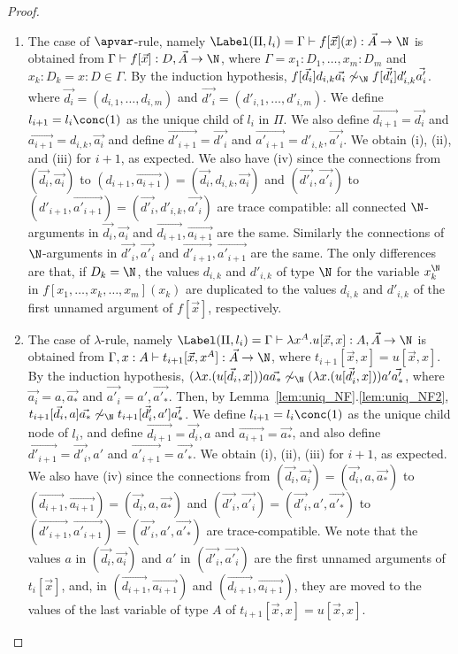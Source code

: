 \begin{proof}
\begin{enumerate}
  \item
    The case of $\apvar$-rule, namely 
    $\Label(\Pi,l_i) 
    = 
    \Gamma \vdash f[\vec{x}](x): \vec{A}\rightarrow\N$ is obtained from
    $\Gamma \vdash f[\vec{x}]: D,\vec{A} \rightarrow \N$,
    where $\Gamma=x_1:D_1,\ldots,x_m:D_m$ and $x_k:D_k = x:D\in\Gamma$. 
    By the induction hypothesis, $f[\vec{d_i}]d_{i,k}\vec{a_i} \not\sim_\N f[\vec{d'_i}]d'_{i,k}\vec{a'_i}$. 
    where $\vec{d_i} = (d_{i,1},\ldots,d_{i,m})$ and $\vec{d'_i} = (d'_{i,1},\ldots,d'_{i,m})$. 
    We define $l_{i+1}=l_i\conc(1)$ as the unique child of $l_i$ in $\Pi$. 
    We also define $\vec{d_{i+1}} = \vec{d_i}$ and $\vec{a_{i+1}} = d_{i,k},\vec{a_i}$
    and define $\vec{d'_{i+1}} = \vec{d'_i}$ and $\vec{a'_{i+1}} = d'_{i,k},\vec{a'_i}$. 
    We obtain (i), (ii), and (iii) for $i+1$, as expected.
    We also have (iv) since the connections from
    $(\vec{d_i},\vec{a_i})$ to $(d_{i+1},\vec{a_{i+1}}) = (\vec{d_i},d_{i,k},\vec{a_i})$
    and
    $(\vec{d'_i},\vec{a'_i})$ to $(d'_{i+1},\vec{a'_{i+1}}) = (\vec{d'_i},d'_{i,k},\vec{a'_i})$
    are trace compatible: all connected $\N$-arguments in $\vec{d_{i}},\vec{a_{i}}$ and 
    $\vec{d_{i+1}},\vec{a_{i+1}}$ are the same. Similarly
    the connections of $\N$-arguments in $\vec{d'_i},\vec{a'_i}$ and $\vec{d'_{i+1}},\vec{a'_{i+1}}$ are the same.
    The only differences are that, if $D_k = \N$, the values $d_{i,k}$ and $d'_{i,k}$ of type $\N$
    for the variable $x_k^\N$ in $f[x_1,\ldots,x_k,\ldots,x_m](x_k)$ are duplicated to the values
    $d_{i,k}$ and $d'_{i,k}$ of the first unnamed argument of $ f[\vec{x}]$, respectively. 

  \item
    The case of $\lambda$-rule, namely
    $\Label(\Pi,l_i) = 
    \Gamma\vdash \lambda x^A.u[\vec{x},x] : A, \vec{A} \rightarrow \N$ is obtained from
    $\Gamma,x:A\vdash t_{i+1}[\vec{x},x^A]:\vec{A}\rightarrow\N$, 
    where $t_{i+1}[\vec{x},x]=u[\vec{x},x]$.
    By the induction hypothesis, $(\lambda x.(u[\vec{d_i},x]))a\vec{a_*} \not\sim_\N (\lambda x.(u[\vec{d'_i},x]))a'\vec{a'_*}$, 
    where $\vec{a_i} = a,\vec{a_*}$ and $\vec{a'_i} = a',\vec{a'_*}$.    
    Then, by Lemma~\ref{lem:uniq_NF}.\ref{lem:uniq_NF2}, $t_{i+1}[\vec{d_i},a]\vec{a_*}\not\sim_\N t_{i+1}[\vec{d'_i},a']\vec{a'_*}$.
    We define $l_{i+1}=l_i\conc(1)$ as the unique child node of $l_i$,
    and define $\vec{d_{i+1}} = \vec{d_i},a$ and $\vec{a_{i+1}} = \vec{a_*}$,
    and also define $\vec{d'_{i+1}} = \vec{d'_i},a'$ and $\vec{a'_{i+1}} = \vec{a'_*}$.
    We obtain (i), (ii), (iii) for $i+1$, as expected.
    We also have (iv) since the connections from 
    $(\vec{d_i},\vec{a_i}) = (\vec{d_i},a,\vec{a_*})$ to $(\vec{d_{i+1}},\vec{a_{i+1}}) = (\vec{d_i},a,\vec{a_*})$
    and
    $(\vec{d'_i},\vec{a'_i}) = (\vec{d'_i},a',\vec{a'_*})$ to $(\vec{d'_{i+1}},\vec{a'_{i+1}}) = (\vec{d'_i},a',\vec{a'_*})$
    are trace-compatible.
    We note that the values $a$ in $(\vec{d_i},\vec{a_i})$ and $a'$ in $(\vec{d'_i},\vec{a'_i})$ are
    the first unnamed arguments of $t_i[\vec{x}]$, and, in $(\vec{d_{i+1}},\vec{a_{i+1}})$ and $(\vec{d_{i+1}},\vec{a_{i+1}})$,
    they are moved to the values of the last variable of type $A$ of $t_{i+1}[\vec{x},x]=u[\vec{x},x]$.


\end{enumerate}
\end{proof}
